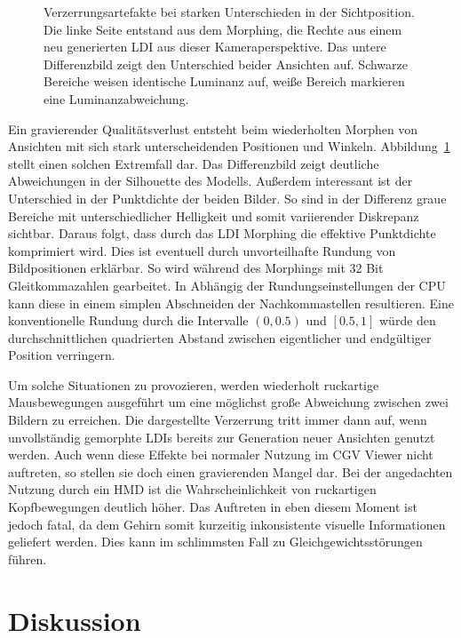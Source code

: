 \documentclass[hyperref, beleg, german]{cgvpub}
\begin{document}
\begin{figure}
	\caption{Verzerrungsartefakte bei starken Unterschieden in der Sichtposition.
	Die linke Seite entstand aus dem Morphing, die Rechte aus einem neu 
	generierten LDI aus dieser Kameraperspektive. Das untere Differenzbild zeigt
	den Unterschied beider Ansichten auf. Schwarze Bereiche weisen identische 
	Luminanz auf, weiße Bereich markieren eine Luminanzabweichung.}%
	\label{img:distortion}
\end{figure}

Ein gravierender Qualitätsverlust entsteht beim wiederholten Morphen von
Ansichten mit sich stark unterscheidenden Positionen und Winkeln.
Abbildung~\ref{img:distortion} stellt einen solchen Extremfall dar. Das
Differenzbild zeigt deutliche Abweichungen in der Silhouette des Modells.
Außerdem interessant ist der Unterschied in der Punktdichte der beiden Bilder.
So sind in der Differenz graue Bereiche mit unterschiedlicher Helligkeit und
somit variierender Diskrepanz sichtbar. Daraus folgt, dass durch das LDI
Morphing die effektive Punktdichte komprimiert wird. Dies ist eventuell durch
unvorteilhafte Rundung von Bildpositionen erklärbar. So wird während des
Morphings mit 32 Bit Gleitkommazahlen gearbeitet. In Abhängig der
Rundungseinstellungen der CPU kann diese in einem simplen Abschneiden der
Nachkommastellen resultieren. Eine konventionelle Rundung durch die Intervalle
\( \left(0, 0.5\right) \) und \( \left[0.5, 1\right] \) würde den
durchschnittlichen quadrierten Abstand zwischen eigentlicher und endgültiger
Position verringern.

Um solche Situationen zu provozieren, werden wiederholt
ruckartige Mausbewegungen ausgeführt um eine möglichst große Abweichung
zwischen zwei Bildern zu erreichen. Die dargestellte Verzerrung tritt immer
dann auf, wenn unvollständig gemorphte LDIs bereits zur Generation neuer
Ansichten genutzt werden. Auch wenn diese Effekte bei normaler Nutzung im CGV
Viewer nicht auftreten, so stellen sie doch einen gravierenden Mangel dar. Bei
der angedachten Nutzung durch ein HMD ist die Wahrscheinlichkeit von
ruckartigen Kopfbewegungen deutlich höher. Das Auftreten in eben diesem Moment
ist jedoch fatal, da dem Gehirn somit kurzeitig inkonsistente visuelle
Informationen geliefert werden. Dies kann im schlimmsten Fall zu
Gleichgewichtsstörungen führen.

\section{Diskussion}%
\label{sec:discussion}
\end{document}
